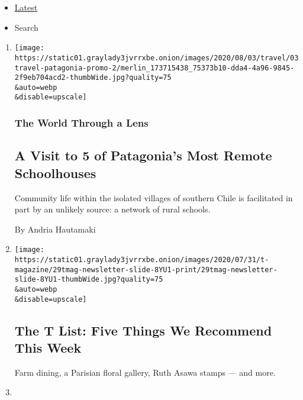 \begin{itemize}
\tightlist
\item
  \protect\hyperlink{stream-panel}{Latest}
\item
  Search
\end{itemize}

\begin{enumerate}
\def\labelenumi{\arabic{enumi}.}
\item
  \href{/2020/08/03/travel/remote-schools-patagonia.html}{}

  \texttt{[image: https://static01.graylady3jvrrxbe.onion/images/2020/08/03/travel/03travel-patagonia-promo-2/merlin\_173715438\_75373b10-dda4-4a96-9845-2f9eb704acd2-thumbWide.jpg?quality=75\\\&auto=webp\\\&disable=upscale]}

  \hypertarget{the-world-through-a-lens}{%
  \subsubsection{The World Through a
  Lens}\label{the-world-through-a-lens}}

  \hypertarget{a-visit-to-5-of-patagonias-most-remote-schoolhouses}{%
  \subsection{A Visit to 5 of Patagonia's Most Remote
  Schoolhouses}\label{a-visit-to-5-of-patagonias-most-remote-schoolhouses}}

  Community life within the isolated villages of southern Chile is
  facilitated in part by an unlikely source: a network of rural schools.

  By Andria Hautamaki
\item
  \href{/2020/07/30/t-magazine/the-t-list-five-things-we-recommend-this-week.html}{}

  \texttt{[image: https://static01.graylady3jvrrxbe.onion/images/2020/07/31/t-magazine/29tmag-newsletter-slide-8YU1-print/29tmag-newsletter-slide-8YU1-thumbWide.jpg?quality=75\\\&auto=webp\\\&disable=upscale]}

  \hypertarget{the-t-list-five-things-we-recommend-this-week}{%
  \subsection{The T List: Five Things We Recommend This
  Week}\label{the-t-list-five-things-we-recommend-this-week}}

  Farm dining, a Parisian floral gallery, Ruth Asawa stamps --- and
  more.
\item
  \href{/2020/07/30/travel/private-jets-coronavirus.html}{}


\end{enumerate}
